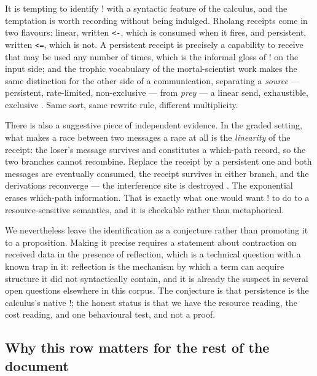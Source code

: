 \begin{remark}
\label{rem:bangpersist}
It is tempting to identify $!$ with a syntactic feature of the calculus, and the
temptation is worth recording without being indulged. Rholang receipts come in two
flavours: linear, written \texttt{<-}, which is consumed when it fires, and
persistent, written \texttt{<=}, which is not. A persistent receipt is precisely a
capability to receive that may be used any number of times, which is the informal
gloss of $!$ on the input side; and the trophic vocabulary of the mortal-scientist
work makes the same distinction for the other side of a communication, separating
a \emph{source} --- persistent, rate-limited, non-exclusive --- from \emph{prey}
--- a linear send, exhaustible, exclusive \cite{ScientistNote}. Same sort, same
rewrite rule, different multiplicity.

There is also a suggestive piece of independent evidence. In the graded setting,
what makes a race between two messages a race at all is the \emph{linearity} of
the receipt: the loser's message survives and constitutes a which-path record, so
the two branches cannot recombine. Replace the receipt by a persistent one and
both messages are eventually consumed, the receipt survives in either branch, and
the derivations reconverge --- the interference site is destroyed
\cite{GradedWhere}. The exponential erases which-path information. That is exactly
what one would want $!$ to do to a resource-sensitive semantics, and it is
checkable rather than metaphorical.

We nevertheless leave the identification as a conjecture rather than promoting it
to a proposition. Making it precise requires a statement about contraction on
received data in the presence of reflection, which is a technical question with a
known trap in it: reflection is the mechanism by which a term can acquire
structure it did not syntactically contain, and it is already the suspect in
several open questions elsewhere in this corpus. The conjecture is that
persistence is the calculus's native $!$; the honest status is that we have the
resource reading, the cost reading, and one behavioural test, and not a proof.
\end{remark}

\subsection{Why this row matters for the rest of the document}

